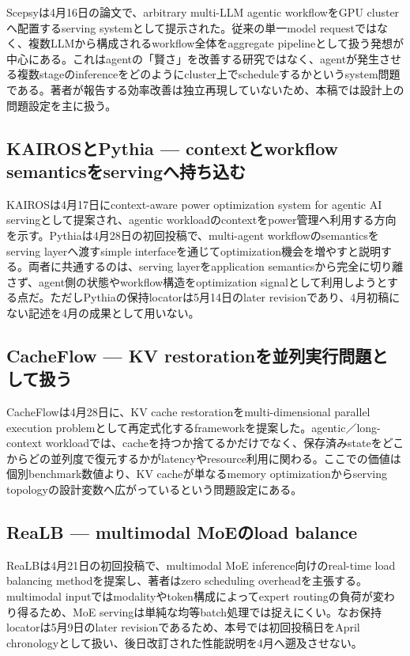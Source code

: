 Scepsyは4月16日の論文で、arbitrary multi-LLM agentic workflowをGPU clusterへ配置するserving systemとして提示された。従来の単一model requestではなく、複数LLMから構成されるworkflow全体をaggregate pipelineとして扱う発想が中心にある。これはagentの「賢さ」を改善する研究ではなく、agentが発生させる複数stageのinferenceをどのようにcluster上でscheduleするかというsystem問題である。著者が報告する効率改善は独立再現していないため、本稿では設計上の問題設定を主に扱う。\autocite{src-e1e959857ced}


\subsection{KAIROSとPythia — contextとworkflow semanticsをservingへ持ち込む}

KAIROSは4月17日にcontext-aware power optimization system for agentic AI servingとして提案され、agentic workloadのcontextをpower管理へ利用する方向を示す。Pythiaは4月28日の初回投稿で、multi-agent workflowのsemanticsをserving layerへ渡すsimple interfaceを通じてoptimization機会を増やすと説明する。両者に共通するのは、serving layerをapplication semanticsから完全に切り離さず、agent側の状態やworkflow構造をoptimization signalとして利用しようとする点だ。ただしPythiaの保持locatorは5月14日のlater revisionであり、4月初稿にない記述を4月の成果として用いない。\autocite{src-551442a9e215,src-d91793d0a6fa}


\subsection{CacheFlow — KV restorationを並列実行問題として扱う}

CacheFlowは4月28日に、KV cache restorationをmulti-dimensional parallel execution problemとして再定式化するframeworkを提案した。agentic／long-context workloadでは、cacheを持つか捨てるかだけでなく、保存済みstateをどこからどの並列度で復元するかがlatencyやresource利用に関わる。ここでの価値は個別benchmark数値より、KV cacheが単なるmemory optimizationからserving topologyの設計変数へ広がっているという問題設定にある。\autocite{src-0fc9d11483aa}


\subsection{ReaLB — multimodal MoEのload balance}

ReaLBは4月21日の初回投稿で、multimodal MoE inference向けのreal-time load balancing methodを提案し、著者はzero scheduling overheadを主張する。multimodal inputではmodalityやtoken構成によってexpert routingの負荷が変わり得るため、MoE servingは単純な均等batch処理では捉えにくい。なお保持locatorは5月9日のlater revisionであるため、本号では初回投稿日をApril chronologyとして扱い、後日改訂された性能説明を4月へ遡及させない。\autocite{src-2a6eae37bd39}



